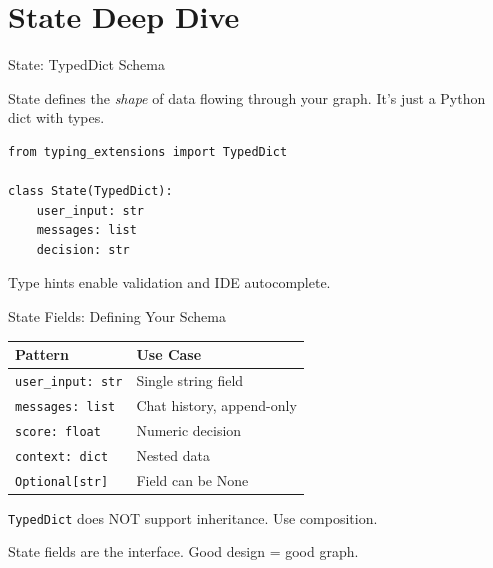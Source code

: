 \documentclass[aspectratio=169,11pt]{beamer}
\begin{document}
\section{State Deep Dive}
\begin{frame}[fragile,t]{State: TypedDict Schema}
\vspace{0.05cm}

\begin{conceptbox}
State defines the \textit{shape} of data flowing through your graph. It's just a Python dict with types.
\end{conceptbox}

\vspace{0.1cm}

\begin{codebox}
\begin{lstlisting}
from typing_extensions import TypedDict

class State(TypedDict):
    user_input: str
    messages: list
    decision: str
\end{lstlisting}
\end{codebox}

\begin{tipbox}[Why]
Type hints enable validation and IDE autocomplete.
\end{tipbox}
\end{frame}

\begin{frame}[fragile,t,shrink=2]{State Fields: Defining Your Schema}
\vspace{0.05cm}

{\footnotesize
\begin{tabular}{p{2.8cm}p{6cm}}
\toprule
\textbf{Pattern} & \textbf{Use Case} \\
\midrule
\texttt{user\_input: str} & Single string field \\
\texttt{messages: list} & Chat history, append-only \\
\texttt{score: float} & Numeric decision \\
\texttt{context: dict} & Nested data \\
\texttt{Optional[str]} & Field can be None \\
\bottomrule
\end{tabular}
}

\vspace{0.08cm}

\begin{warningbox}[No Inheritance]
\texttt{TypedDict} does NOT support inheritance. Use composition.
\end{warningbox}

\vspace{0.05cm}

{\footnotesize State fields are the interface. Good design = good graph.}
\end{frame}
\end{document}
